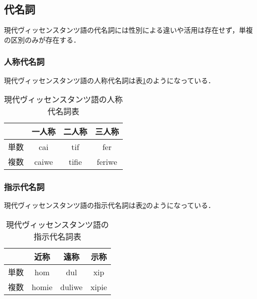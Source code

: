 \documentclass[a4paper,xelatex,ja=standard]{bxjsarticle}
\begin{document}
\subsection{代名詞}
現代ヴィッセンスタンツ語の代名詞には性別による違いや活用は存在せず，単複の区別のみが存在する．


\subsubsection{人称代名詞}
現代ヴィッセンスタンツ語の人称代名詞は表\ref{vic_human_pronoum}のようになっている．
\begin{table}[htbp]
 \caption{現代ヴィッセンスタンツ語の人称代名詞表}
 \label{vic_human_pronoum}
 \begin{center}
  \begin{tabular}{|c||c|c|c|} \hline
   & 一人称 & 二人称 & 三人称 \\ \hline \hline
   単数 & cai & tif & fer \\ \hline
   複数 & caiwe & tifie & feriwe \\ \hline
  \end{tabular}
 \end{center}
\end{table}

\subsubsection{指示代名詞}
現代ヴィッセンスタンツ語の指示代名詞は表\ref{vic_obj_pronoum}のようになっている．
\begin{table}[htbp]
 \caption{現代ヴィッセンスタンツ語の指示代名詞表}
 \label{vic_obj_pronoum}
 \begin{center}
  \begin{tabular}{|c||c|c|c|} \hline
   & 近称 & 遠称 & 示称 \\ \hline \hline
   単数 & hom & dul & xip \\ \hline
   複数 & homie & duliwe & xipie \\ \hline
  \end{tabular}
 \end{center}
\end{table}
\end{document}
